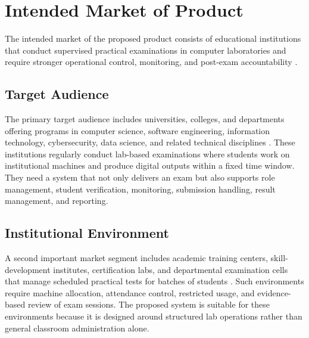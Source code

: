\section{Intended Market of Product}

The intended market of the proposed product consists of educational institutions that conduct supervised practical examinations in computer laboratories and require stronger operational control, monitoring, and post-exam accountability \cite{pmc_cbt}.

\subsection{Target Audience}
The primary target audience includes universities, colleges, and departments offering programs in computer science, software engineering, information technology, cybersecurity, data science, and related technical disciplines \cite{eassess1}. These institutions regularly conduct lab-based examinations where students work on institutional machines and produce digital outputs within a fixed time window. They need a system that not only delivers an exam but also supports role management, student verification, monitoring, submission handling, result management, and reporting.

\subsection{Institutional Environment}
A second important market segment includes academic training centers, skill-development institutes, certification labs, and departmental examination cells that manage scheduled practical tests for batches of students \cite{mit_cbt}. Such environments require machine allocation, attendance control, restricted usage, and evidence-based review of exam sessions. The proposed system is suitable for these environments because it is designed around structured lab operations rather than general classroom administration alone.
